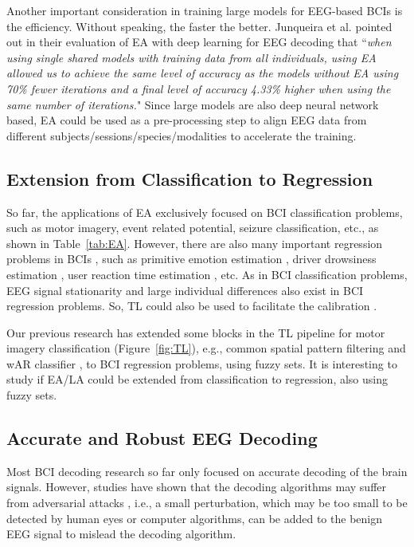 \documentclass[journal]{IEEEtran}
\begin{document}
Another important consideration in training large models for EEG-based BCIs is the efficiency. Without speaking, the faster the better. Junqueira et al. \cite{Junqueira2024} pointed out in their evaluation of EA with deep learning for EEG decoding that ``\emph{when using single shared models with training data from all individuals, using EA allowed us to achieve the same level of accuracy as the models without EA using 70\% fewer iterations and a final level of accuracy 4.33\% higher when using the same number of iterations.}" Since large models are also deep neural network based, EA could be used as a pre-processing step to align EEG data from different subjects/sessions/species/modalities to accelerate the training.

\subsection{Extension from Classification to Regression}

So far, the applications of EA exclusively focused on BCI classification problems, such as motor imagery, event related potential, seizure classification, etc., as shown in Table~\ref{tab:EA}. However, there are also many important regression problems in BCIs \cite{drwuTLBCI2022}, such as primitive emotion estimation \cite{drwuPIEEE2023}, driver drowsiness estimation \cite{drwuFWET2019}, user reaction time estimation \cite{drwuRG2017}, etc. As in BCI classification problems, EEG signal stationarity and large individual differences also exist in BCI regression problems. So, TL could also be used to facilitate the calibration \cite{drwuTFS2017}.

Our previous research has extended some blocks in the TL pipeline for motor imagery classification (Figure~\ref{fig:TL}), e.g., common spatial pattern filtering \cite{drwuSF2018} and wAR classifier \cite{drwuTFS2017}, to BCI regression problems, using fuzzy sets. It is interesting to study if EA/LA could be extended from classification to regression, also using fuzzy sets.

\subsection{Accurate and Robust EEG Decoding}

Most BCI decoding research so far only focused on accurate decoding of the brain signals. However, studies have shown that the decoding algorithms may suffer from adversarial attacks \cite{drwuBCIAttack2019,drwuTAR2019,drwuNSO2022,drwuSCIS2022,drwuAP2023,drwuBackdoor2023,drwuIF2024}, i.e., a small perturbation, which may be too small to be detected by human eyes or computer algorithms, can be added to the benign EEG signal to mislead the decoding algorithm.
\end{document}
